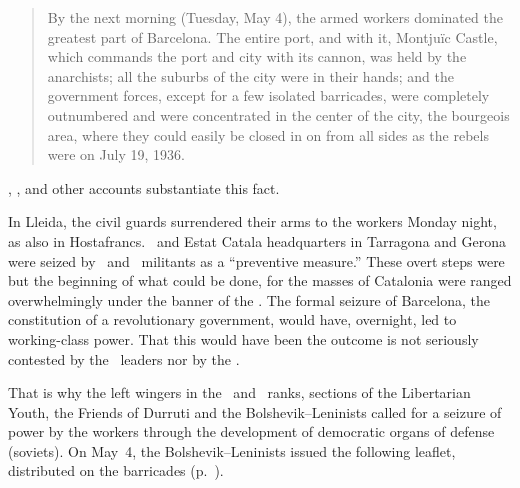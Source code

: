 \begin{quotation}
  By the next morning (Tuesday, May 4), the armed workers dominated the greatest part of Barcelona. The entire port, and with it, Montjuïc Castle, which commands the port and city with its cannon, was held by the anarchists; all the suburbs of the city were in their hands; and the government forces, except for a few isolated barricades, were completely outnumbered and were concentrated in the center of the city, the bourgeois area, where they could easily be closed in on from all sides as the rebels were on July 19, 1936.
\end{quotation}

\CNT, \POUM, and other accounts substantiate this fact.

\smallskip

In Lleida, the civil guards surrendered their arms to the workers Monday night, as also in Hostafrancs. \PSUC\ and Estat Catala headquarters in Tarragona and Gerona were seized by \POUM\ and \CNT\ militants as a ``preventive measure.'' These overt steps were but the beginning of what could be done, for the masses of Catalonia were ranged overwhelmingly under the banner of the \CNT\kn. The formal seizure of Barcelona, the constitution of a revolutionary government, would have, overnight, led to working-class power. That this would have been the outcome is not seriously contested by the \CNT\ leaders nor by the \POUM.

That is why the left wingers in the \CNT\ and \POUM\ ranks, sections of the Libertarian Youth, the Friends of Durruti and the Bolshevik--Leninists called for a seizure of power by the workers through the development of democratic organs of defense (soviets). On May~4, the Bolshevik--Leninists issued the following leaflet, distributed on the barricades (p.~\pageref{fig:bolshlenleaflet}).

